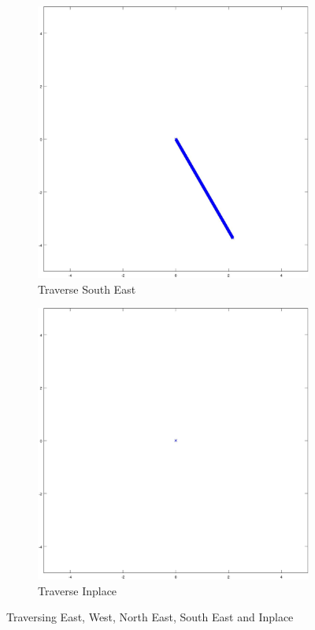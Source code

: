 \documentclass{article}
\begin{document}
\begin{figure}[H]
	\begin{subfigure}[b]{0.32\linewidth}
		\includegraphics[width=\textwidth]{images/traverse_south_east.jpg}
		\caption{Traverse South East}
	\end{subfigure}
	\begin{subfigure}[b]{0.32\linewidth}
		\includegraphics[width=\textwidth]{images/traverse_inplace.jpg}
		\caption{Traverse Inplace}
	\end{subfigure}
	
	\caption{Traversing East, West, North East, South East and Inplace}
	\label{fig:omni_robot_traverse}
\end{figure}
\end{document}
